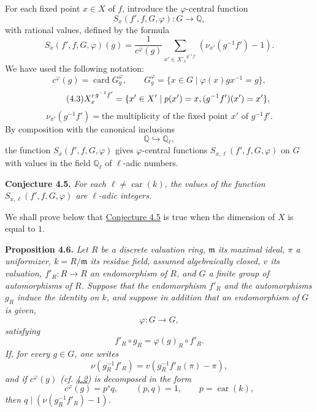 \documentclass[11pt]{article}
\providecommand{\fm}{\mathfrak{m}}
\providecommand{\car}{\operatorname{car}}
\providecommand{\car}{\operatorname{car}}
\providecommand{\bQ}{\mathbb Q}
\providecommand{\fm}{\mathfrak m}
\providecommand{\card}{\operatorname{card}}
\providecommand{\car}{\operatorname{car}}
\begin{document}
For each fixed point $x\in X$ of $f$, introduce the $\varphi$-central function
\[
S_x(f',f,G,\varphi):G\longrightarrow \bQ,
\]
with rational values, defined by the formula
\begin{equation}\tag{4.1}\label{sga5:XII:equation:4.1}
S_x(f',f,G,\varphi)(g)=
\frac{1}{c^\varphi(g)}
\sum_{x'\in {X'_x}^{g^{-1}f'}}(\nu_{x'}(g^{-1}f')-1).
\end{equation}
We have used the following notation:
\begin{equation}\tag{4.2}\label{sga5:XII:equation:4.2}
c^\varphi(g)=\card G_g^\varphi,
\qquad
G_g^\varphi=\{x\in G\mid \varphi(x)gx^{-1}=g\},
\end{equation}
\begin{equation}\tag{4.3}\label{sga5:XII:equation:4.3}
{X'_x}^{g^{-1}f'}=\{x'\in X'\mid p(x')=x,\\ (g^{-1}f')(x')=x'\},
\end{equation}
\begin{equation}\tag{4.4}\label{sga5:XII:equation:4.4}
\nu_{x'}(g^{-1}f')=\text{the multiplicity of the fixed point }x'\text{ of }g^{-1}f'.
\end{equation}
By composition with the canonical inclusions
\[
\bQ\hookrightarrow \bQ_\ell,
\]
the function $S_x(f',f,G,\varphi)$ gives $\varphi$-central functions $S_{x,\ell}(f',f,G,\varphi)$ on $G$ with values in the field $\bQ_\ell$ of $\ell$-adic numbers.

\medskip
\noindent
{}\label{sga5:XII:conjecture:4.5}\textbf{Conjecture 4.5.} \emph{For each $\ell\ne\car(k)$, the values of the function $S_{x,\ell}(f',f,G,\varphi)$ are $\ell$-adic integers.}

\medskip
We shall prove below that \hyperref[sga5:XII:conjecture:4.5]{Conjecture 4.5} is true when the dimension of $X$ is equal to $1$.

\medskip
\noindent
{}\label{sga5:XII:proposition:4.6}\textbf{Proposition 4.6.} \emph{Let $R$ be a discrete valuation ring, $\fm$ its maximal ideal, $\pi$ a uniformizer, $k=R/\fm$ its residue field, assumed algebraically closed, $v$ its valuation, $f'_R:R\to R$ an endomorphism of $R$, and $G$ a finite group of automorphisms of $R$. Suppose that the endomorphism $f'_R$ and the automorphisms $g_R$ induce the identity on $k$, and suppose in addition that an endomorphism of $G$ is given,
\[
\varphi:G\longrightarrow G,
\]
satisfying
\[
f'_R\circ g_R=\varphi(g)_R\circ f'_R.
\]
If, for every $g\in G$, one writes
\[
\nu(g_R^{-1}f'_R)=v(g_R^{-1}f'_R(\pi)-\pi),
\]
and if $c^\varphi(g)$ (cf. \hyperref[sga5:XII:equation:4.2]{4.2}) is decomposed in the form
\[
c^\varphi(g)=p^sq,
\qquad (p,q)=1,
\qquad p=\car(k),
\]
then $q\mid(\nu(g_R^{-1}f'_R)-1)$.}
\end{document}

